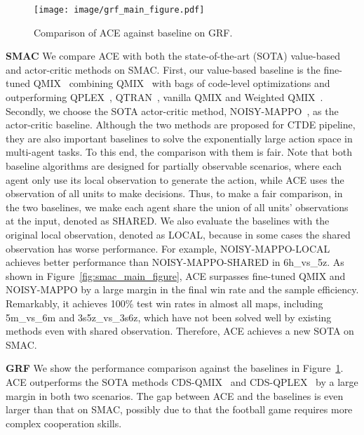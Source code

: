 \documentclass[letterpaper]{article} \usepackage{aaai23}  \usepackage{times}  \usepackage{helvet}  \usepackage{courier}  \usepackage[hyphens]{url}  \usepackage{graphicx} \urlstyle{rm} \def\UrlFont{\rm}  \usepackage{natbib}  \usepackage{caption} \frenchspacing  \setlength{\pdfpagewidth}{8.5in} \setlength{\pdfpageheight}{11in} \usepackage{algorithm}
\begin{document}
\begin{figure}[t]
    \centering
    \texttt{[image: image/grf\_main\_figure.pdf]}
\vspace{-2ex}
    \caption{Comparison of ACE against baseline on GRF.
}
\label{fig:grf_main_figure}
\vspace{-4ex}
\end{figure}

\textbf{SMAC}
We compare ACE with both the state-of-the-art (SOTA) value-based and actor-critic methods on SMAC. First, our value-based baseline is the fine-tuned QMIX~\citeyear{pymarl2} combining QMIX~\citeyear{qmix} with bags of code-level optimizations and outperforming QPLEX~\citeyear{wang2020qplex}, QTRAN~\citeyear{qtran}, vanilla QMIX and Weighted QMIX~\citeyear{wqmix}. Secondly, we choose the SOTA actor-critic method, NOISY-MAPPO~\citeyear{noisy_mappo}, as the actor-critic baseline. Although the two methods are proposed for CTDE pipeline, they are also important baselines to solve the exponentially large action space in multi-agent tasks. To this end, the comparison with them is fair.
Note that both baseline algorithms are designed for partially observable scenarios, where each agent only use its local observation to generate the action, while ACE uses the observation of all units to make decisions. Thus, to make a fair comparison, in the two baselines, we make each agent share the union of all units' observations at the input, denoted as SHARED. We also evaluate the baselines with the original local observation, denoted as LOCAL, because in some cases the shared observation has worse performance. For example, NOISY-MAPPO-LOCAL achieves better performance than NOISY-MAPPO-SHARED in 6h\_vs\_5z. As shown in Figure~\ref{fig:smac_main_figure}, ACE surpasses fine-tuned QMIX and NOISY-MAPPO by a large margin in the final win rate and the sample efficiency. Remarkably, it achieves 100\% test win rates in almost all maps, including 5m\_vs\_6m and 3s5z\_vs\_3s6z, which have not been solved well by existing methods even with shared observation. Therefore, ACE achieves a new SOTA on SMAC.

\textbf{GRF}
We show the performance comparison against the baselines in Figure~\ref{fig:grf_main_figure}. ACE outperforms the SOTA methods CDS-QMIX~\citeyear{cds} and CDS-QPLEX~\citeyear{cds} by a large margin in both two scenarios. The gap between ACE and the baselines is even larger than that on SMAC, possibly due to that the football game requires more complex cooperation skills.
\vspace{-2ex}
\end{document}
